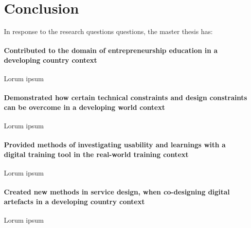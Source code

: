 \chapter{Conclusion}\label{cha:conclusion}


In response to the research questions questions, the master thesis has: %

\subsubsection{Contributed to the domain of entrepreneurship education in a developing country context}
Lorum ipsum

\subsubsection{Demonstrated how certain technical constraints and design constraints can be overcome in a developing world context} %
Lorum ipsum

\subsubsection{Provided methods of investigating usability and learnings with a digital training tool in the real-world training context} %
Lorum ipsum

\subsubsection{Created new methods in service design, when co-designing digital artefacts in a developing country context}
Lorum ipsum
